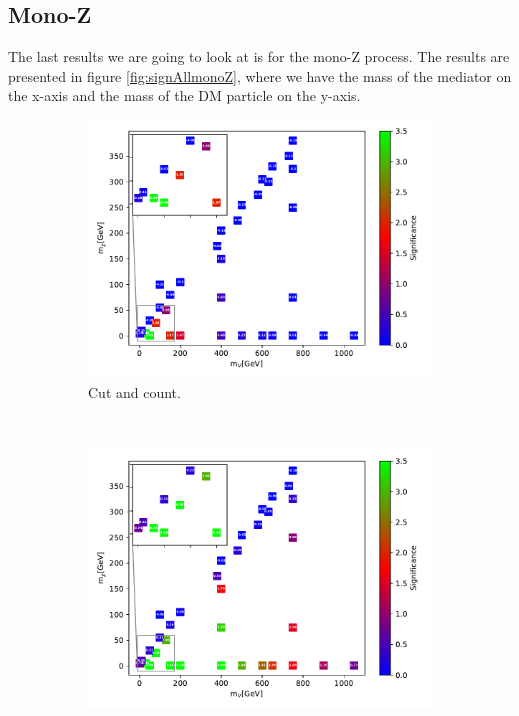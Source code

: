 \subsection{Mono-Z}
\label{sec:resMono-Z}

The last results we are going to look at is for the mono-Z process. The results are presented in figure \ref{fig:signAllmonoZ}, where we have the mass of the mediator on the x-axis and the mass of the DM particle on the y-axis. 

\begin{figure}[H]
    \centering
    \begin{subfigure}[t!]{0.49\textwidth}
    \includegraphics[width = \textwidth]{Figures/Significances/significanceCutandCount_monoZ_all.pdf}
    \caption{Cut and count.}
        \label{fig:signAllmonoZcandc}
    \end{subfigure}
    \\
    \begin{subfigure}[t!]{0.49\textwidth}
    \includegraphics[width = \textwidth]{Figures/Significances/significance_BDT_monoZ_All_level.pdf}

\end{subfigure}
\end{figure}
